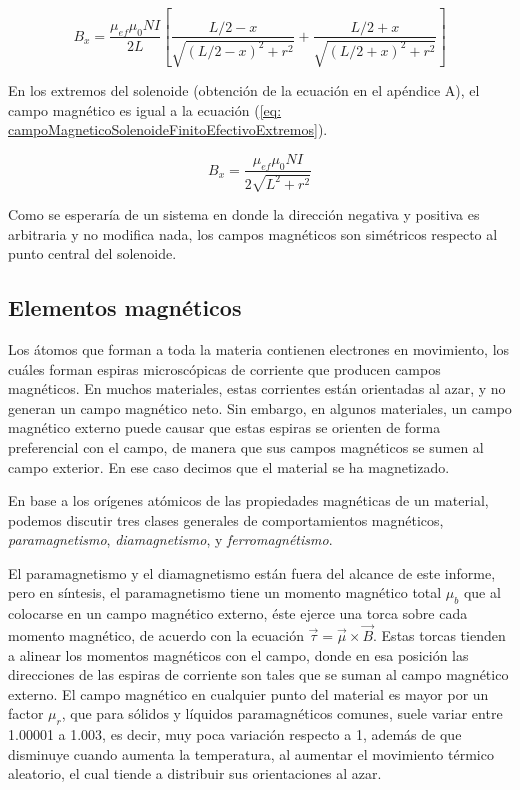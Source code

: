 \documentclass[a4paper,12pt]{article}
\begin{document}
        \begin{equation}
            \label{eq: campoMagneticoSolenoideFinitoEfectivo}
            B_x = \frac{\mu_{ef}\mu_0 N I}{2L} \left[ \frac{L/2 - x}{\sqrt{(L/2 - x)^2 + r^2}} + \frac{L/2 + x}{\sqrt{(L/2 + x)^2 + r^2}} \right]
        \end{equation}

        En los extremos del solenoide (obtención de la ecuación en el apéndice A), el campo magnético es igual a la ecuación (\ref{eq: campoMagneticoSolenoideFinitoEfectivoExtremos}).

        \begin{equation}
            \label{eq: campoMagneticoSolenoideFinitoEfectivoExtremos}
            B_x = \frac{\mu_{ef}\mu_0 N I}{2\sqrt{L^2 + r^2}}
        \end{equation}

        Como se esperaría de un sistema en donde la dirección negativa y positiva es arbitraria y no modifica nada, los campos magnéticos son simétricos respecto al punto central del solenoide.

    \subsection*{Elementos magnéticos}

        Los átomos que forman a toda la materia contienen electrones en movimiento, los cuáles forman espiras microscópicas de corriente que producen campos magnéticos. En muchos materiales, estas corrientes están orientadas al azar, y no generan un campo magnético neto. Sin embargo, en algunos materiales, un campo magnético externo puede causar que estas espiras se orienten de forma preferencial con el campo, de manera que sus campos magnéticos se sumen al campo exterior. En ese caso decimos que el material se ha magnetizado. 

        En base a los orígenes atómicos de las propiedades magnéticas de un material, podemos discutir tres clases generales de comportamientos magnéticos, \emph{paramagnetismo}, \emph{diamagnetismo}, y \emph{ferromagnétismo}. 

        El paramagnetismo y el diamagnetismo están fuera del alcance de este informe, pero en síntesis, el paramagnetismo tiene un momento magnético total $\mu_b$ que al colocarse en un campo magnético externo, éste ejerce una torca sobre cada momento magnético, de acuerdo con la ecuación $\vec{\tau} = \vec{\mu} \times \vec{B}$. Estas torcas tienden a alinear los momentos magnéticos con el campo, donde en esa posición las direcciones de las espiras de corriente son tales que se suman al campo magnético externo. El campo magnético en cualquier punto del material es mayor por un factor $\mu_r$, que para sólidos y líquidos paramagnéticos comunes, suele variar entre 1.00001 a 1.003, es decir, muy poca variación respecto a 1, además de que disminuye cuando aumenta la temperatura, al aumentar el movimiento térmico aleatorio, el cual tiende a distribuir sus orientaciones al azar.
\end{document}
